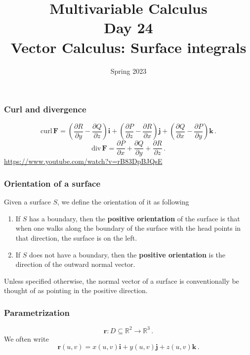 \documentclass[aspectratio=169]{beamer}
\title{ Multivariable Calculus \\ Day  24 \\ Vector Calculus: Surface integrals}
\date{Spring 2023}
\begin{document}
\maketitle

\begin{frame}
    \frametitle{Curl and divergence}
\begin{equation*}
    \mathrm{curl}\,\mathbf{F} =  \left( \frac{\partial R}{\partial y} - \frac{\partial Q}{\partial z} \right) \mathbf{i}
                       + \left( \frac{\partial P}{\partial z} - \frac{\partial R}{\partial x}  \right)  \mathbf{j}
                         + \left( \frac{\partial Q}{\partial x} - \frac{\partial P}{\partial y}  \right) \mathbf{k} \,.
\end{equation*}
\begin{equation*}
    \mathrm{div}\,\mathbf{F} =  
    \frac{\partial P}{\partial x} + \frac{\partial Q}{\partial y} + \frac{\partial R}{\partial z} \,.
\end{equation*}
    \url{https://www.youtube.com/watch?v=rB83DpBJQsE}
\end{frame}


\begin{frame}
    \frametitle{Orientation of a surface}
Given a surface \(S\), we define the orientation of it as following

\begin{enumerate}
\item
  If \(S\) has a boundary, then the \textbf{positive orientation} of the surface is that
  when one walks along the boundary of the surface with the head points in that direction, the surface is on the left.
\item
  If \(S\) does not have a boundary, then the \textbf{positive orientation} is the direction of the outward normal vector.
\end{enumerate}
Unless specified otherwise, the normal vector of a surface is conventionally
be thought of as pointing in the positive direction.
\end{frame}

\begin{frame}
    \frametitle{Parametrization}
\begin{equation*}
\mathbf{r}: D\subseteq \mathbb{R}^2 \to \mathbb{R}^3 \,.
\end{equation*}
We often write
\begin{equation*}
    \mathbf{r}(u,v) = x(u,v) \mathbf{i} + y(u,v) \mathbf{j} + z(u,v) \mathbf{k} \,.
\end{equation*}

\end{frame}
\end{document}

